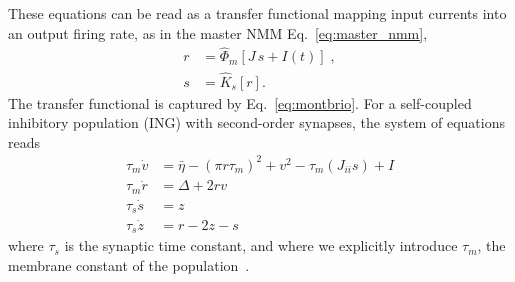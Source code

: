 \documentclass[11pt]{article}
\numberwithin{equation}{section}
\newcommand{\rev}[1]{\begingroup\color{black}#1\endgroup}
\begin{document}
These equations can be read as a transfer functional mapping input currents into an output firing rate,  as in the master NMM Eq.~\ref{eq:master_nmm},
\begin{equation}
\label{eq:master_nmm2}
\begin{aligned}
r &=  \hat \Phi_m [J\, s +  I(t)] \;,\\
 s &= \hat K_s [r].
\end{aligned}
\end{equation}
The transfer functional is captured by Eq.~\ref{eq:montbrio}.  For a self-coupled inhibitory population (ING) with second-order synapses, the system of equations reads
\begin{equation}
\begin{aligned}
\tau_m \dot{v} &= \bar\eta - \left( \pi r \tau_m \right)^2 + v^2 - \tau_m \left( J_{ii} s \right) + I \\
\tau_m \dot{r} &= \Delta + 2 r v \\
\tau_s \dot{s} &= z \\
\tau_s \dot{z} &= r - 2z - s
\end{aligned}
\label{eq:nmm2-ING}
\end{equation}
where $\tau_s$ is the synaptic time constant, and where we explicitly introduce $\tau_m$, the membrane constant of the population~\cite{clusellaComparisonExactHeuristic2023}. 
\end{document}
